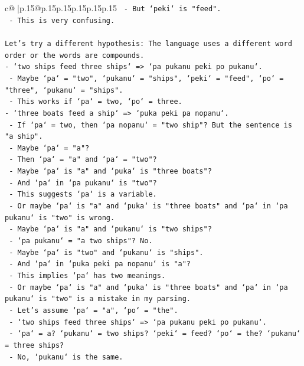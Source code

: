 \documentclass{article}
\begin{document}
{\begin{supertabular}{c@{$\;$}|p{.15\linewidth}@{}p{.15\linewidth}p{.15\linewidth}p{.15\linewidth}p{.15\linewidth}p{.15\linewidth}}
{{{\texttt{    {-} But `peki` is "feed".} \\
\texttt{    {-} This is very confusing.} \\
\\ 
\texttt{Let's try a different hypothesis: The language uses a different word order or the words are compounds.} \\
\texttt{{-} `two ships feed three ships` => `pa pukanu peki po pukanu`.} \\
\texttt{  {-} Maybe `pa` = "two", `pukanu` = "ships", `peki` = "feed", `po` = "three", `pukanu` = "ships".} \\
\texttt{  {-} This works if `pa` = two, `po` = three.} \\
\texttt{{-} `three boats feed a ship` => `puka peki pa nopanu`.} \\
\texttt{  {-} If `pa` = two, then `pa nopanu` = "two ship"? But the sentence is "a ship".} \\
\texttt{  {-} Maybe `pa` = "a"?} \\
\texttt{  {-} Then `pa` = "a" and `pa` = "two"?} \\
\texttt{  {-} Maybe `pa` is "a" and `puka` is "three boats"?} \\
\texttt{  {-} And `pa` in `pa pukanu` is "two"?} \\
\texttt{  {-} This suggests `pa` is a variable.} \\
\texttt{  {-} Or maybe `pa` is "a" and `puka` is "three boats" and `pa` in `pa pukanu` is "two" is wrong.} \\
\texttt{  {-} Maybe `pa` is "a" and `pukanu` is "two ships"?} \\
\texttt{  {-} `pa pukanu` = "a two ships"? No.} \\
\texttt{  {-} Maybe `pa` is "two" and `pukanu` is "ships".} \\
\texttt{  {-} And `pa` in `puka peki pa nopanu` is "a"?} \\
\texttt{  {-} This implies `pa` has two meanings.} \\
\texttt{  {-} Or maybe `pa` is "a" and `puka` is "three boats" and `pa` in `pa pukanu` is "two" is a mistake in my parsing.} \\
\texttt{  {-} Let's assume `pa` = "a", `po` = "the".} \\
\texttt{  {-} `two ships feed three ships` => `pa pukanu peki po pukanu`.} \\
\texttt{    {-} `pa` = a? `pukanu` = two ships? `peki` = feed? `po` = the? `pukanu` = three ships?} \\
\texttt{    {-} No, `pukanu` is the same.} \\
}}}
\end{supertabular}}
\end{document}
